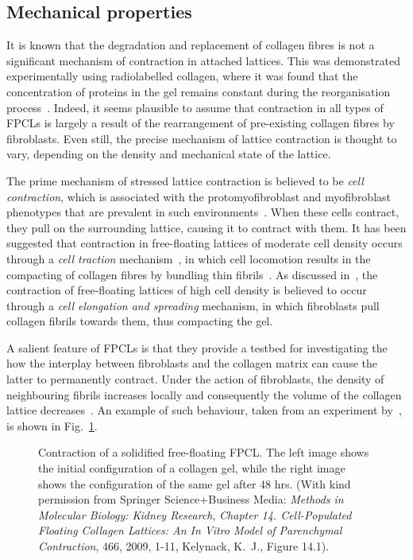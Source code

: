 \subsection{Mechanical properties}
\label{S:FPCLpermcontract}

It is known that the degradation and replacement of collagen fibres is not a significant mechanism of contraction in attached lattices. This was demonstrated experimentally using radiolabelled collagen, where it was found that the concentration of proteins in the gel remains constant during the reorganisation process~\citep{Guidry1985}. Indeed, it seems plausible to assume that contraction in all types of FPCLs is largely a result of the rearrangement of pre-existing collagen fibres by fibroblasts. Even still, the precise mechanism of lattice contraction is thought to vary, depending on the density and mechanical state of the lattice.

The prime mechanism of stressed lattice contraction is believed to be \textit{cell contraction}, which is associated with the protomyofibroblast and myofibroblast phenotypes that are prevalent in such environments~\citep{Dallon2008}. When these cells contract, they pull on the surrounding lattice, causing it to contract with them. It has been suggested that contraction in free-floating lattices of moderate cell density occurs through a \textit{cell traction} mechanism~\citep{Dallon2008}, in which cell locomotion results in the compacting of collagen fibres by bundling thin fibrils~\citep{Harris1980,Ehrlich2003}. As discussed in~\citet{Dallon2008}, the contraction of free-floating lattices of high cell density is believed to occur through a \textit{cell elongation and spreading} mechanism, in which fibroblasts pull collagen fibrils towards them, thus compacting the gel.

A salient feature of FPCLs is that they provide a testbed for investigating the how the interplay between fibroblasts and the collagen matrix can cause the latter to permanently contract. Under the action of fibroblasts, the density of neighbouring fibrils increases locally and consequently the volume of the collagen lattice decreases~\citep{Grinnell2003}. An example of such behaviour, taken from an experiment by~\citet{Kelynack2009}, is shown in Fig.~\ref{fig:FPCL}.

\begin{figure}[ht]
\caption{Contraction of a solidified free-floating FPCL. The left image shows the initial configuration of a collagen gel, while the right image shows the configuration of the same gel after 48 hrs. (With kind permission from Springer Science+Business Media: \emph{Methods in Molecular Biology: Kidney Research}, \textit{Chapter 14. Cell-Populated Floating Collagen Lattices: An In Vitro Model of Parenchymal Contraction}, 466, 2009, 1-11, Kelynack, K.~J., Figure 14.1).}
\label{fig:FPCL}
\end{figure}

